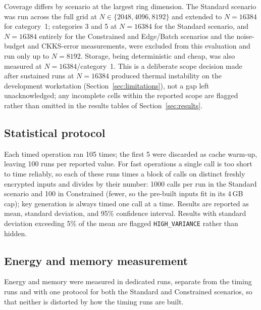 Coverage differs by scenario at the largest ring dimension. The Standard scenario was run across the full grid at $N \in \{2048, 4096, 8192\}$ and extended to $N=16384$ for category~1; categories 3 and 5 at $N=16384$ for the Standard scenario, and $N=16384$ entirely for the Constrained and Edge/Batch scenarios and the noise-budget and CKKS-error measurements, were excluded from this evaluation and run only up to $N=8192$. Storage, being deterministic and cheap, was also measured at $N=16384$/category~1. This is a deliberate scope decision made after sustained runs at $N=16384$ produced thermal instability on the development workstation (Section~\ref{sec:limitations}), not a gap left unacknowledged; any incomplete cells within the reported scope are flagged rather than omitted in the results tables of Section~\ref{sec:results}.

\subsection{Statistical protocol}

Each timed operation ran 105 times; the first 5 were discarded as cache warm-up, leaving 100 runs per reported value. For fast operations a single call is too short to time reliably, so each of these runs times a block of calls on distinct freshly encrypted inputs and divides by their number: 1000 calls per run in the Standard scenario and 100 in Constrained (fewer, so the pre-built inputs fit in its 4\,GB cap); key generation is always timed one call at a time. Results are reported as mean, standard deviation, and 95\% confidence interval. Results with standard deviation exceeding 5\% of the mean are flagged \texttt{HIGH\_VARIANCE} rather than hidden.

\subsection{Energy and memory measurement}
\label{sec:energy-protocol}

Energy and memory were measured in dedicated runs, separate from the timing runs and with one protocol for both the Standard and Constrained scenarios, so that neither is distorted by how the timing runs are built.


